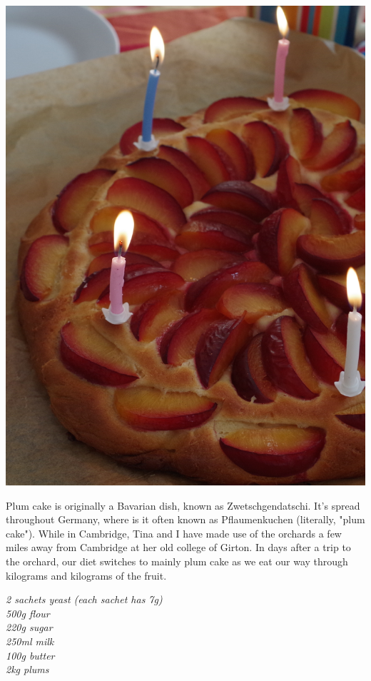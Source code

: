 \documentclass{tufte-book}
\begin{document}
\begin{marginfigure}%
  \includegraphics[width=\linewidth]{plumcake.png}
\end{marginfigure}

Plum cake is originally a Bavarian dish, known as Zwetschgendatschi. It's spread throughout Germany, where is it often known as Pflaumenkuchen (literally, "plum cake"). While in Cambridge, Tina and I have made use of the orchards a few miles away from Cambridge at her old college of Girton. In days after a trip to the orchard, our diet switches to mainly plum cake as we eat our way through kilograms and kilograms of the fruit.

\smallskip
\emph{2 sachets yeast (each sachet has 7g)
\\500g flour
\\220g sugar
\\250ml milk
\\100g butter
\\2kg plums
}
\end{document}
